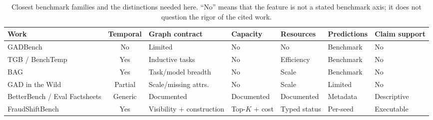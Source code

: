 \begin{table}[t]
\caption{Closest benchmark families and the distinctions needed here. ``No'' means that the feature is not a stated benchmark axis; it does not question the rigor of the cited work.}
\label{tab:related-comparison}
\centering
\footnotesize
\setlength{\tabcolsep}{3.2pt}
\begin{tabularx}{\textwidth}{@{}p{}c p{}p{}p{}p{}X@{}}
\toprule
Work & Temporal & Graph contract & Capacity & Resources & Predictions & Claim support \\
\midrule
GADBench & No & Limited & No & No & Benchmark & No \\
TGB / BenchTemp & Yes & Inductive tasks & No & Efficiency & Benchmark & No \\
BAG & Yes & Task/model breadth & No & Scale & Benchmark & No \\
GAD in the Wild & Partial & Scale/missing attrs. & No & Scale & Limited & No \\
BetterBench / Eval Factsheets & Generic & Documented & Documented & Documented & Metadata & Descriptive \\
FraudShiftBench & Yes & Visibility + construction & Top-$K$ + cost & Typed status & Per-seed & Executable \\
\bottomrule
\end{tabularx}
\end{table}
